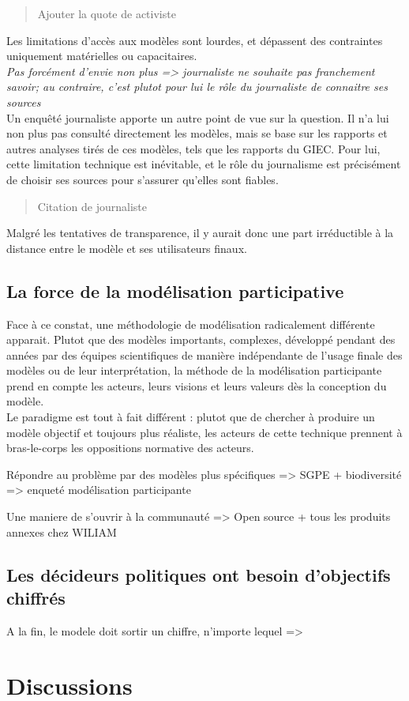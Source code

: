 \begin{quote}
    Ajouter la quote de activiste
\end{quote}

Les limitations d'accès aux modèles sont lourdes, et dépassent des contraintes uniquement matérielles ou capacitaires. \\

\textit{Pas forcément d'envie non plus
=> journaliste ne souhaite pas franchement savoir; au contraire, c'est plutot pour lui le rôle du journaliste de connaitre ses sources} \\

Un enquêté journaliste apporte un autre point de vue sur la question. Il n'a lui non plus pas consulté directement les modèles, mais se base sur les rapports et autres analyses tirés de ces modèles, tels que les rapports du GIEC. Pour lui, cette limitation technique est inévitable, et le rôle du journalisme est précisément de choisir ses sources pour s'assurer qu'elles sont fiables. 

\begin{quote}
    Citation de journaliste
\end{quote}

Malgré les tentatives de transparence, il y aurait donc une part irréductible à la distance entre le modèle et ses utilisateurs finaux. 

\subsection{La force de la modélisation participative}

Face à ce constat, une méthodologie de modélisation radicalement différente apparait. Plutot que des modèles importants, complexes, développé pendant des années par des équipes scientifiques de manière indépendante de l'usage finale des modèles ou de leur interprétation, la méthode de la modélisation participante prend en compte les acteurs, leurs visions et leurs valeurs dès la conception du modèle. \\

Le paradigme est tout à fait différent : plutot que de chercher à produire un modèle objectif et toujours plus réaliste, les acteurs de cette technique prennent à bras-le-corps les oppositions normative des acteurs. 

Répondre au problème par des modèles plus spécifiques
=> SGPE + biodiversité
=> enqueté modélisation participante

Une maniere de s'ouvrir à la communauté
=> Open source + tous les produits annexes chez WILIAM

\subsection{Les décideurs politiques ont besoin d'objectifs chiffrés}

A la fin, le modele doit sortir un chiffre, n'importe lequel
=> 


\section{Discussions}








